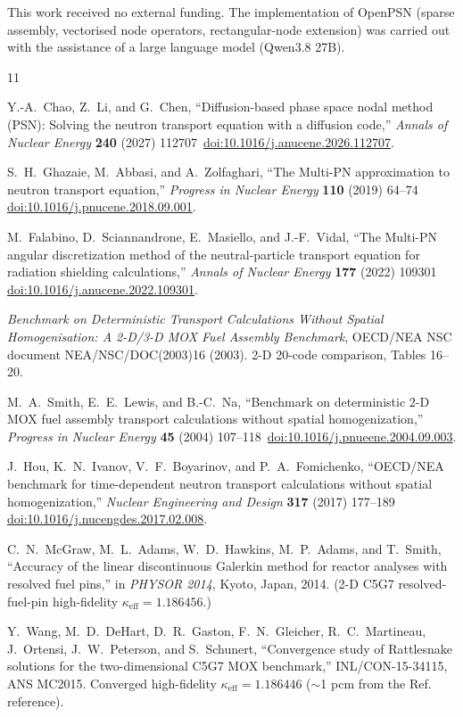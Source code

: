 \documentclass[11pt,a4paper]{article}
\newcommand{\keff}{\kappa_{\mathrm{eff}}}
\newcommand{\doi}[1]{\,\href{https://doi.org/#1}{doi:#1}}
\begin{document}
This work received no external funding. The implementation of OpenPSN
(sparse assembly, vectorised node operators, rectangular-node
extension) was carried out with the assistance of a large language model
(Qwen3.8 27B).

\begin{thebibliography}{11}
\small

Y.-A.~Chao, Z.~Li, and G.~Chen, ``Diffusion-based phase space nodal method
(PSN): Solving the neutron transport equation with a diffusion code,''
\emph{Annals of Nuclear Energy} \textbf{240} (2027) 112707
\doi{10.1016/j.anucene.2026.112707}.

S.~H.~Ghazaie, M.~Abbasi, and A.~Zolfaghari, ``The Multi-PN approximation
to neutron transport equation,'' \emph{Progress in Nuclear Energy}
\textbf{110} (2019) 64--74 \doi{10.1016/j.pnucene.2018.09.001}.

M.~Falabino, D.~Sciannandrone, E.~Masiello, and J.-F.~Vidal, ``The
Multi-PN angular discretization method of the neutral-particle
transport equation for radiation shielding calculations,''
\emph{Annals of Nuclear Energy} \textbf{177} (2022) 109301
\doi{10.1016/j.anucene.2022.109301}.

\emph{Benchmark on Deterministic Transport Calculations Without Spatial
Homogenisation: A 2-D/3-D MOX Fuel Assembly Benchmark}, OECD/NEA NSC
document NEA/NSC/DOC(2003)16 (2003). 2-D 20-code comparison,
Tables 16--20.

M.~A.~Smith, E.~E.~Lewis, and B.-C.~Na, ``Benchmark on deterministic
2-D MOX fuel assembly transport calculations without spatial
homogenization,'' \emph{Progress in Nuclear Energy} \textbf{45} (2004)
107--118 \doi{10.1016/j.pnueene.2004.09.003}.

J.~Hou, K.~N.~Ivanov, V.~F.~Boyarinov, and P.~A.~Fomichenko, ``OECD/NEA
benchmark for time-dependent neutron transport calculations without
spatial homogenization,'' \emph{Nuclear Engineering and Design}
\textbf{317} (2017) 177--189 \doi{10.1016/j.nucengdes.2017.02.008}.

C.~N.~McGraw, M.~L.~Adams, W.~D.~Hawkins, M.~P.~Adams, and T.~Smith,
``Accuracy of the linear discontinuous Galerkin method for reactor
analyses with resolved fuel pins,'' in \emph{PHYSOR 2014}, Kyoto,
Japan, 2014. (2-D C5G7 resolved-fuel-pin high-fidelity
$\keff=1.186456$.)

Y.~Wang, M.~D.~DeHart, D.~R.~Gaston, F.~N.~Gleicher, R.~C.~Martineau,
J.~Ortensi, J.~W.~Peterson, and S.~Schunert, ``Convergence study of
Rattlesnake solutions for the two-dimensional C5G7 MOX benchmark,''
INL/CON-15-34115, ANS MC2015. Converged high-fidelity
$\keff=1.186446$ ($\sim$1 pcm from the Ref.~\cite{mcgraw2014} reference).


\end{thebibliography}
\end{document}
